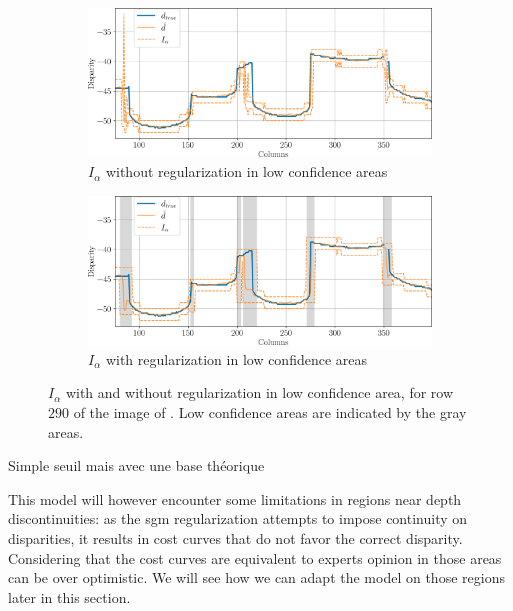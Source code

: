 \begin{figure}
    \centering
    \begin{subfigure}[t]{\linewidth}
        \centering
        \includegraphics[width=\linewidth]{Images/Chap_5/intervals_ambiguous_area_row_290_1.png}
        \caption{$I_\alpha$ without regularization in low confidence areas}
        \label{fig:intervals_ambiguous_row_290_1}
    \end{subfigure}\hfill
    \begin{subfigure}[t]{\linewidth}
        \centering
        \includegraphics[width=\linewidth]{Images/Chap_5/intervals_ambiguous_area_row_290_2.png}
        \caption{$I_\alpha$ with regularization in low confidence areas}
        \label{fig:intervals_ambiguous_row_290_2}
    \end{subfigure}
    \caption{$I_\alpha$ with and without regularization in low confidence area, for row $290$ of the image of . Low confidence areas are indicated by the gray areas.}
    \label{fig:intervals_ambiguous_row_290}
\end{figure}

Simple seuil mais avec une base théorique

 This model will however encounter some limitations in regions near depth discontinuities: as the \acrshort{sgm} regularization attempts to impose continuity on disparities, it results in cost curves that do not favor the correct disparity. Considering that the cost curves are equivalent to experts opinion in those areas can be over optimistic. We will see how we can adapt the model on those regions later in this section.

